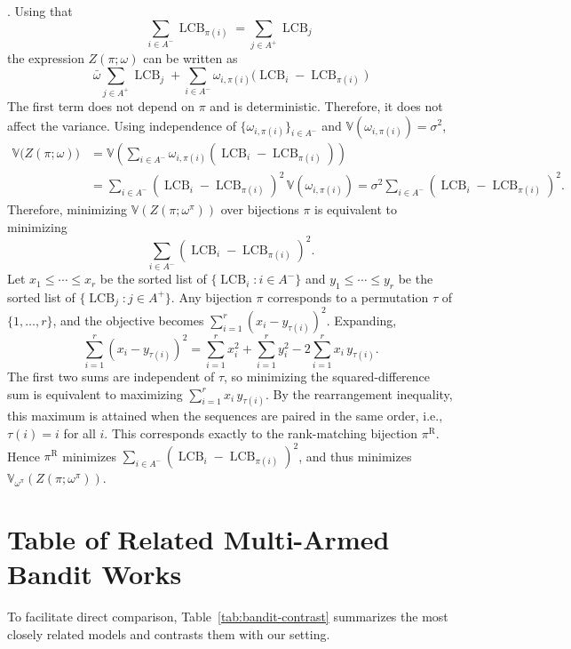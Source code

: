 \documentclass[opre,blindrev]{informs3}
\newcommand{\LCB}{\operatorname{LCB}}
\begin{document}
\begin{APPENDICES}
. 
    Using that 
    \[\sum_{i\in A^-}\LCB_{\pi(i)}=\sum_{j\in A^+}\LCB_{j}\]
    the expression \(Z(\pi;\omega)\) can be written as
    \[\bar{\omega}\sum_{j\in A^+}\LCB_{j} +\sum_{i\in A^-}\omega_{i,\pi(i)}\bigl(\LCB_i-\LCB_{\pi(i)}\bigr)\]
    The first term does not depend on \(\pi\) and is deterministic. Therefore, it does not affect the variance. Using independence of \(\{\omega_{i,\pi(i)}\}_{i\in A^-}\) and \(\mathbb{V}(\omega_{i,\pi(i)})=\sigma^2\),
    \begin{align*}
        \mathbb{V}\bigl(Z(\pi;\omega)\bigr) &= \mathbb{V}\!\left(\sum_{i\in A^-}\omega_{i,\pi(i)}(\LCB_i-\LCB_{\pi(i)})\right) \\
        &= \sum_{i\in A^-}(\LCB_i-\LCB_{\pi(i)})^2\,\mathbb{V}(\omega_{i,\pi(i)}) 
        = \sigma^2\sum_{i\in A^-}(\LCB_i-\LCB_{\pi(i)})^2.
    \end{align*}
    Therefore, minimizing \(\mathbb{V}(Z(\pi;\omega^{\pi}))\) over bijections \(\pi\) is equivalent to minimizing 
    \[\sum_{i\in A^-}(\LCB_i-\LCB_{\pi(i)})^2.\]
    Let \(x_1\le\cdots\le x_r\) be the sorted list of \(\{\LCB_i:i\in A^-\}\) and \(y_1\le\cdots\le y_r\) be the sorted list
    of \(\{\LCB_j:j\in A^+\}\). Any bijection \(\pi\) corresponds to a permutation \(\tau\) of \(\{1,\dots,r\}\), and the
    objective becomes \(\sum_{i=1}^r (x_i-y_{\tau(i)})^2\). Expanding,
    \[
    \sum_{i=1}^r (x_i-y_{\tau(i)})^2
    =
    \sum_{i=1}^r x_i^2+\sum_{i=1}^r y_i^2
    -2\sum_{i=1}^r x_i\,y_{\tau(i)}.
    \]
    The first two sums are independent of \(\tau\), so minimizing the squared-difference sum is equivalent to maximizing \(\sum_{i=1}^r x_i\,y_{\tau(i)}\). By the rearrangement inequality, this maximum is attained when the sequences are paired in the same order, i.e., \(\tau(i)=i\) for all \(i\). This corresponds exactly to the rank-matching bijection \(\pi^{\mathrm{R}}\). Hence \(\pi^{\mathrm{R}}\) minimizes \(\sum_{i\in A^-}(\LCB_i-\LCB_{\pi(i)})^2\), and thus
    minimizes \(\mathbb{V}_{\omega^{\pi}}(Z(\pi;\omega^{\pi}))\).
\Halmos 

\newpage
\section{Table of Related Multi-Armed Bandit Works}
\label{sec:related_works_table}
To facilitate direct comparison, Table~\ref{tab:bandit-contrast} summarizes the most closely related models and contrasts them with our setting.
\begin{table}[H]
\end{table}
\end{APPENDICES}
\end{document}
